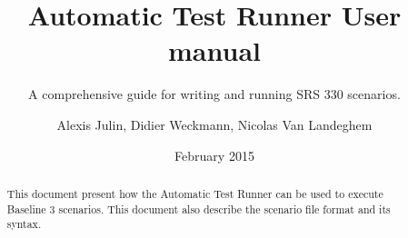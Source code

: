 \documentclass{openETCS/openetcs}
\begin{document}
\frontmatter
{}





\title{Automatic Test Runner User manual}

\subtitle{A comprehensive guide for writing and running SRS 330 scenarios.}

\date{February 2015}








\author{Alexis Julin, Didier Weckmann, Nicolas Van Landeghem}




\begin{abstract}
	This document present how the Automatic Test Runner can be used to execute Baseline 3 scenarios. This document also describe the scenario file format and its syntax.
\end{abstract}

\maketitle

\end{document}
